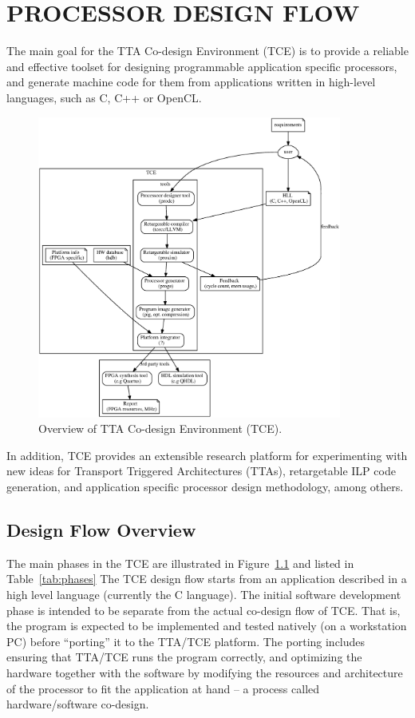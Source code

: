 \documentclass[twoside]{tceusermanual}
\begin{document}
\chapter{PROCESSOR DESIGN FLOW}
\label{chapter:tceFlow}


The main goal for the TTA Co-design Environment (TCE) is to provide a
reliable and effective toolset for designing programmable application
specific processors, and generate machine code for them from
applications written in high-level languages, such as C, C++ or
OpenCL.
\begin{figure}
  \begin{center} \includegraphics[width=10cm]{eps/tce_flow}
  \caption{Overview of TTA Co-design Environment (TCE). } 
  \label{fig:tce_flow} \end{center}
\end{figure}

In addition, TCE provides an extensible research platform for 
experimenting with new ideas for Transport Triggered Architectures (TTAs), 
retargetable ILP code generation, and application specific processor 
design methodology, among others.

\section{Design Flow Overview}

The main phases in the TCE are illustrated in
Figure~\ref{fig:tce_flow} and listed in Table~\ref{tab:phases} The
TCE design flow starts from an application described in a high level
language (currently the C language).  The initial software development
phase is intended to be separate from the actual co-design flow of
TCE. That is, the program is expected to be implemented and tested
natively (on a workstation PC) before ``porting'' it to the TTA/TCE
platform. The porting includes ensuring that TTA/TCE runs the program
correctly, and optimizing the hardware together with the software by
modifying the resources and architecture of the processor to fit the
application at hand -- a process called hardware/software co-design.
\end{document}
